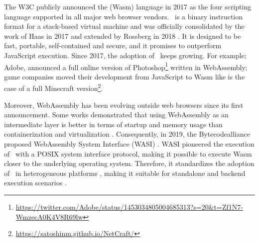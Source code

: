 \msection{\Wasm}
\label{sota:wasm}

The W3C publicly announced the \Wasm(Wasm) language in 2017 as the four scripting language supported in all major web browser vendors.
\wasm\ is a binary instruction format for a stack-based virtual machine and was officially consolidated by the work of Haas \etal \cite{Haas_2017} in 2017 and extended by Rossberg \etal in 2018 \cite{10.1145/3282510}. 
It is designed to be fast, portable, self-contained and secure, and it promises to outperform JavaScript execution. 
Since 2017, the adoption of \wasm\ keeps growing. 
For example; Adobe, announced a full online version of Photoshop\footnote{\url{https://twitter.com/Adobe/status/1453034805004685313?s=20&t=Zf1N7-WmzecA0K4V8R69lw}} written in WebAssembly;  game companies moved their development from JavaScript to Wasm like is the case of a full Minecraft version\footnote{\url{https://satoshinm.github.io/NetCraft/}}. 

Moreover, WebAssembly has been evolving outside web browsers since its first announcement.
Some works demonstrated that using WebAssembly as an intermediate layer is better in terms of startup and memory usage than containerization and virtualization \cite{pMendkiServerless, 1244493Jacobsson}. 
Consequently, in 2019, the Bytecodealliance proposed WebAssembly System Interface (WASI) \cite{WASI}. 
WASI pioneered the execution of \wasm\ with a POSIX system interface protocol, making it possible to execute Wasm closer to the underlying operating system. 
Therefore, it standardizes the adoption of \wasm\ in heterogeneous platforms \cite{bryant2020webassembly}, making it suitable for standalone and backend execution scenarios \cite{9640153, wen2020wasmachine}.

